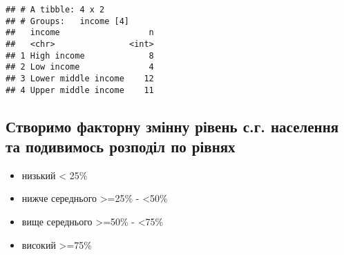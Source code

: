 \documentclass[
]{article}
\newenvironment{Shaded}{\begin{snugshade}}{\end{snugshade}}
\newcommand{\DataTypeTok}[1]{\textcolor[rgb]{0.13,0.29,0.53}{#1}}
\newcommand{\DecValTok}[1]{\textcolor[rgb]{0.00,0.00,0.81}{#1}}
\newcommand{\KeywordTok}[1]{\textcolor[rgb]{0.13,0.29,0.53}{\textbf{#1}}}
\newcommand{\NormalTok}[1]{#1}
\newcommand{\OperatorTok}[1]{\textcolor[rgb]{0.81,0.36,0.00}{\textbf{#1}}}
\newcommand{\OtherTok}[1]{\textcolor[rgb]{0.56,0.35,0.01}{#1}}
\newcommand{\StringTok}[1]{\textcolor[rgb]{0.31,0.60,0.02}{#1}}
\providecommand{\tightlist}{%
  \setlength{\itemsep}{0pt}\setlength{\parskip}{0pt}}
\begin{document}
\begin{verbatim}
## # A tibble: 4 x 2
## # Groups:   income [4]
##   income                  n
##   <chr>               <int>
## 1 High income             8
## 2 Low income              4
## 3 Lower middle income    12
## 4 Upper middle income    11
\end{verbatim}

\hypertarget{ux441ux442ux432ux43eux440ux438ux43cux43e-ux444ux430ux43aux442ux43eux440ux43dux443-ux437ux43cux456ux43dux43dux443-ux440ux456ux432ux435ux43dux44c-ux441.ux433.-ux43dux430ux441ux435ux43bux435ux43dux43dux44f-ux442ux430-ux43fux43eux434ux438ux432ux438ux43cux43eux441ux44c-ux440ux43eux437ux43fux43eux434ux456ux43b-ux43fux43e-ux440ux456ux432ux43dux44fux445}{%
\subsection{Створимо факторну змінну рівень с.г. населення та подивимось
розподіл по
рівнях}\label{ux441ux442ux432ux43eux440ux438ux43cux43e-ux444ux430ux43aux442ux43eux440ux43dux443-ux437ux43cux456ux43dux43dux443-ux440ux456ux432ux435ux43dux44c-ux441.ux433.-ux43dux430ux441ux435ux43bux435ux43dux43dux44f-ux442ux430-ux43fux43eux434ux438ux432ux438ux43cux43eux441ux44c-ux440ux43eux437ux43fux43eux434ux456ux43b-ux43fux43e-ux440ux456ux432ux43dux44fux445}}

\begin{itemize}
\tightlist
\item
  низький \textless{} 25\%
\item
  нижче середнього \textgreater=25\% - \textless50\%
\item
  вище середнього \textgreater=50\% - \textless75\%
\item
  високий \textgreater=75\%
\end{itemize}

\begin{Shaded}
\end{Shaded}
\end{document}
